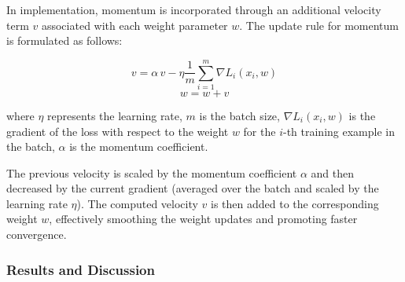 In implementation, momentum is incorporated through an additional velocity term \(v\) associated with each weight parameter \(w\). The update rule for momentum is formulated as follows:

\[
    v = \alpha\, v - \eta \frac{1}{m}\sum_{i=1}^{m} \nabla L_i(x_i, w)
\]
\[
    w = w + v
\]

where \(\eta\) represents the learning rate, \(m\) is the batch size, \(\nabla L_i(x_i, w)\) is the gradient of the loss with respect to the weight \(w\) for the \(i\)-th training example in the batch, \(\alpha\) is the momentum coefficient.

The previous velocity is scaled by the momentum coefficient \(\alpha\) and then decreased by the current gradient (averaged over the batch and scaled by the learning rate \(\eta\)). The computed velocity \(v\) is then added to the corresponding weight \(w\), effectively smoothing the weight updates and promoting faster convergence.

\subsubsection{Results and Discussion}

